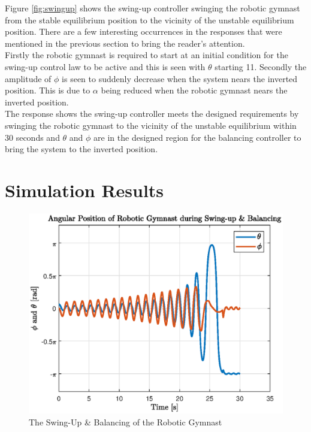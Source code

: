 Figure \ref{fig:swingup} shows the swing-up controller swinging the robotic gymnast from the stable equilibrium position to the vicinity of the unstable equilibrium position. There are a few interesting occurrences in the responses that were mentioned in the previous section to bring the reader's attention.\\

Firstly the robotic gymnast is required to start at an initial condition for the swing-up control law to be active and this is seen with $\theta$ starting 11\textdegree. Secondly the amplitude of $\phi$ is seen to suddenly decrease when the system nears the inverted position. This is due to $\alpha$ being reduced when the robotic gymnast nears the inverted position.\\

The response shows the swing-up controller meets the designed requirements by swinging the robotic gymnast to the vicinity of the unstable equilibrium within 30 seconds and $\theta$ and $\phi$ are in the designed region for the balancing controller to bring the system to the inverted position.



\section{Simulation Results}
\begin{figure}[h]
	\centering
	\includegraphics[scale=1]{./figs/swingup_balance}
	\caption{The Swing-Up \& Balancing of the Robotic Gymnast}
	\label{fig:swingup_balance}
\end{figure}


